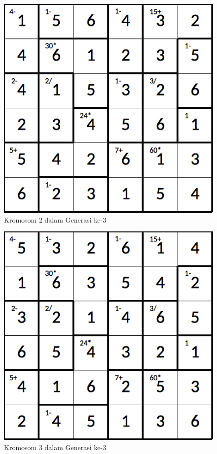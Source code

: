 \documentclass[a4paper,twoside]{article}
\begin{document}
\begin{enumerate}
\begin{figure}
\centering
\captionsetup{justification=centering}
\includegraphics[scale=0.333]{Gambar/hybridgenetic/Generation3Chromosome2}
\caption[Kromosom 2 dalam Generasi ke-3]{Kromosom 2 dalam Generasi ke-3}
\label{fig:analisisg3k2}
\end{figure}

\begin{figure}
\centering
\captionsetup{justification=centering}
\includegraphics[scale=0.333]{Gambar/hybridgenetic/Generation3Chromosome3}
\caption[Kromosom 3 dalam Generasi ke-3]{Kromosom 3 dalam Generasi ke-3}
\label{fig:analisisg3k3}
\end{figure}


\end{enumerate}
\end{document}
